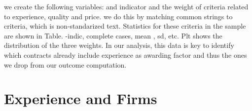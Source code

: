 we create the following variables: and indicator and the weight of criteria related to experience, quality and price. we do this by matching common strings to criteria, which is non-standarized text. Statistics for these criteria in the sample are shown in Table. -indic, complete cases, mean , sd, etc. Plt shows the distribution of the three weights. In our analysis, this data is key to identify which contracts already include experience as awarding factor and thus the ones we drop from our outcome computation.

\section{Experience and Firms}
